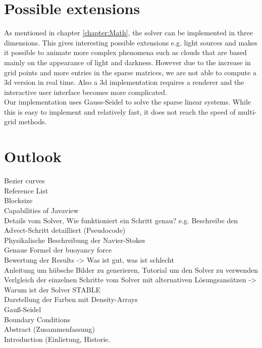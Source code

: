 \documentclass[a4paper,10pt,oneside,final,german,openbib,pdftex,titlepage]{scrbook}
\begin{document}
\chapter{Possible extensions}
As mentioned in chapter \ref{chapter:Math}, the solver can be implemented in three dimensions. This gives interesting possible extensions e.g. light sources and makes it possible to animate more complex phenomena such as clouds that are based mainly on the appearance of light and darkness. However due to the increase in grid points and more entries in the sparse matrices, we are not able to compute a 3d version in real time. Also a 3d implementation requires a renderer and the interactive user interface becomes more complicated.\\

Our implementation uses Gauss-Seidel to solve the sparse linear systems. While this is easy to implement and relatively fast, it does not reach the speed of multi-grid methods. 
\chapter{Outlook}

Bezier curves\\
Reference List\\
Blocksize\\
Capabilities of Javaview\\
Details vom Solver, Wie funktioniert ein Schritt genau? e.g. Beschreibe den Advect-Schritt detailliert (Pseudocode)\\
Physikalische Beschreibung der Navier-Stokes\\
Genaue Formel der buoyancy force\\
Bewertung der Results -> Was ist gut, was ist schlecht\\
Anleitung um hübsche Bilder zu generieren, Tutorial um den Solver zu verwenden\\
Verlgleich der einzelnen Schritte vom Solver mit alternativen Lösungsansätzen -> Warum ist der Solver STABLE\\
Darstellung der Farben mit Density-Arrays\\
Gauß-Seidel\\
Boundary Conditions\\
Abstract (Zusammenfassung)\\
Introduction (Einlietung, Historie.\\
\end{document}
